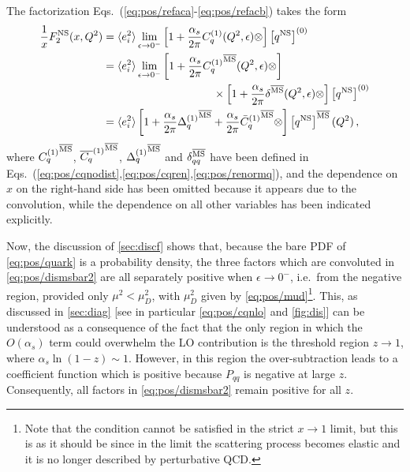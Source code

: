 The factorization Eqs.~(\ref{eq:pos/refaca}-\ref{eq:pos/refacb}) takes the
form
\begin{align}
  \frac{1}{x} F_2^{{\textrm{NS}}}(x,Q^2)&= \langle e_i^2\rangle
\lim_{\epsilon\to
  0^-}\left[1
    +\frac{\alpha_s}{2\pi} C_{q}^{(1)}(Q^2,\epsilon) \otimes \right] 
    \left[{q^{{\textrm{NS}}}}\right]^{(0)} \label{eq:pos/dismsbar} \\
&= \langle e_i^2\rangle
\lim_{\epsilon\to
  0^-}\left[1 +\frac{\alpha_s}{2\pi} {C_{q}^{(1)}}^{{\overline{\textrm{MS}}}}(Q^2, \epsilon) \otimes \right]
  \nonumber\\
  &\qquad\qquad\qquad\qquad\qquad
    \times\left[1 +\frac{\alpha_s}{2\pi} \delta^{{\overline{\textrm{MS}}}} (Q^2,\epsilon) \otimes \right]
     \left[{q^{{\textrm{NS}}}}\right]^{(0)} \label{eq:pos/dismsbar1} \\
    &=  \langle e_i^2\rangle
\left[1+ \frac{\alpha_s}{2\pi} {\Delta^{(1)}_q}^{{\overline{\textrm{MS}}}}
  +\frac{\alpha_s}{2\pi}    {\bar{C}_{q}^{(1)}{}}^{{\overline{\textrm{MS}}}} \otimes
  \right] 
     \left[{q^{{\textrm{NS}}}}\right]^{{\overline{\textrm{MS}}}}(Q^2) \,, \label{eq:pos/dismsbar2}
\end{align}
where $ {C_{q}^{(1)}}^{{\overline{\textrm{MS}}}}$,  ${\overline{C_{q}}^{(1)}}^{{\overline{\textrm{MS}}}}$,
${\Delta^{(1)}_q}^{{\overline{\textrm{MS}}}}$ and $ \delta_{qq}^{{\overline{\textrm{MS}}}} $ have been
defined in Eqs.~(\ref{eq:pos/cqnodist},\ref{eq:pos/cqren},\ref{eq:pos/renormq}),
and the dependence on $x$ on the  right-hand side has been omitted
because it appears due to the convolution, while the dependence on all
other variables has been indicated explicitly.

Now, the discussion of \cref{sec:discf} shows that, because the
bare PDF of \cref{eq:pos/quark} is a probability density, the three
factors which are convoluted in \cref{eq:pos/dismsbar2} are all
separately positive when $\epsilon \to 0^-$, i.e.\ from the negative
region, provided only $\mu^2< \mu_D^2$, with $\mu_D^2$ given by
\cref{eq:pos/mud}\footnote{Note that the condition cannot be satisfied in
the strict $x\to1$ limit, but this is as it should be since in the
limit the scattering process becomes elastic and it is no longer
described by perturbative QCD.}.
This, as discussed in \cref{sec:diag} [see in particular \cref{eq:pos/cqnlo}
and \cref{fig:dis}] can be understood as a consequence of the fact that the
only region in which the $O(\alpha_s)$ term could overwhelm the LO contribution
is the threshold region $z\to 1$, where $\alpha_s\ln(1-z)\sim1$.
However, in this region the \msbar{} over-subtraction leads to a
coefficient function which is positive because $P_{qq}$ is negative at
large $z$.
Consequently, all factors in \cref{eq:pos/dismsbar2} remain positive for all
$z$.

